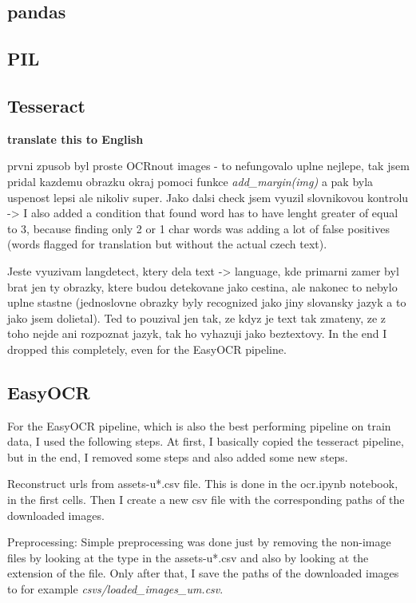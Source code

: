 \documentclass[
  digital,     %
  oneside,     %
  nosansbold,  %
  nocolorbold, %
  nolof,         %
  nolot,         %
]{fithesis4}
\begin{document}
\subsection{pandas}

\subsection{PIL}

\subsection{Tesseract}

\textbf{translate this to English}

prvni zpusob byl proste OCRnout images - to nefungovalo uplne nejlepe, tak jsem pridal kazdemu obrazku okraj pomoci funkce \emph{add\_margin(img)} a pak byla uspenost lepsi ale nikoliv super. Jako dalsi check jsem vyuzil slovnikovou kontrolu -> I also added a condition that found word has to have lenght greater of equal to 3, because finding only 2 or 1 char words was adding a lot of false positives (words flagged for translation but without the actual czech text).

Jeste vyuzivam langdetect, ktery dela text -> language, kde primarni zamer byl brat jen ty obrazky, ktere budou detekovane jako cestina, ale nakonec to nebylo uplne stastne (jednoslovne obrazky byly recognized jako jiny slovansky jazyk a to jako jsem dolietal). Ted to pouzival jen tak, ze kdyz je text tak zmateny, ze z toho nejde ani rozpoznat jazyk, tak ho vyhazuji jako beztextovy. In the end I dropped this completely, even for the EasyOCR pipeline.

\subsection{EasyOCR}

For the EasyOCR pipeline, which is also the best performing pipeline on train data, I used the following steps. At first, I basically copied the tesseract pipeline, but in the end, I removed some steps and also added some new steps.

Reconstruct urls from assets-u*.csv file. This is done in the ocr.ipynb notebook, in the first cells. Then I create a new csv file with the corresponding paths of the downloaded images.

Preprocessing: Simple preprocessing was done just by removing the non-image files by looking at the type in the assets-u*.csv and also by looking at the extension of the file. Only after that, I save the paths of the downloaded images to for example \emph{csvs/loaded\_images\_um.csv}.
\end{document}
